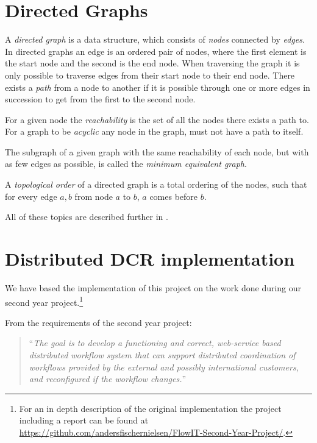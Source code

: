         
	\section{Directed Graphs}
		A \textit{directed graph} is a data structure, which consists of \textit{nodes} connected by \textit{edges}. In directed graphs an edge is an ordered pair of nodes, where the first element is the start node and the second is the end node. When traversing the graph it is only possible to traverse edges from their start node to their end node. There exists a \textit{path} from a node to another if it is possible through one or more edges in succession to get from the first to the second node.
	
		For a given node the \textit{reachability} is the set of all the nodes there exists a path to. For a graph to be \textit{acyclic} any node in the graph, must not have a path to itself. 
	
		The subgraph of a given graph with the same reachability of each node, but with as few edges as possible, is called the \textit{minimum equivalent graph}.
	
		A \textit{topological order} of a directed graph is a total ordering of the nodes, such that for every edge $a,b$ from node $a$ to $b$, $a$ comes before $b$.
		
		\newpar All of these topics are described further in \cite{sedgewick2011algorithms}.
		
	\section{Distributed DCR implementation}\label{sec:background:implementation}
		We have based the implementation of this project on the work done during our second year project.\footnote{For an in depth description of the original implementation the project including a report can be found at \url{https://github.com/andersfischernielsen/FlowIT-Second-Year-Project/}.}
		
		\newpar From the requirements of the second year project:
		
		\begin{quotation}
			\noindent``\textit{The goal is to develop a functioning and correct, web-service based distributed workflow system that can support distributed coordination of workflows provided by the external and possibly international customers, and reconfigured if the workflow changes.}''
		\end{quotation}
		
